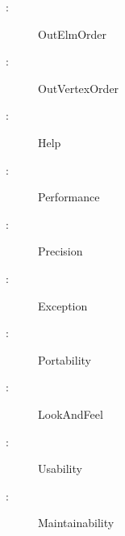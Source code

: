 \documentclass[12pt,titlepage]{article}
\begin{document}
\begin{description}
\item[:] OutElmOrder
 \label{OutVertexOrder}
\item[:] OutVertexOrder
 \label{Help}
\item[:] Help
 \label{Performance}
\item[:] Performance
 \label{Precision}
\item[:] Precision
 \label{Exception}
\item[:] Exception
 \label{Portability}
\item[:] Portability
 \label{LookAndFeel}
\item[:] LookAndFeel
 \label{Usability}
\item[:] Usability
 \label{Maintainability}
\item[:] Maintainability

\end{description}
\end{document}
